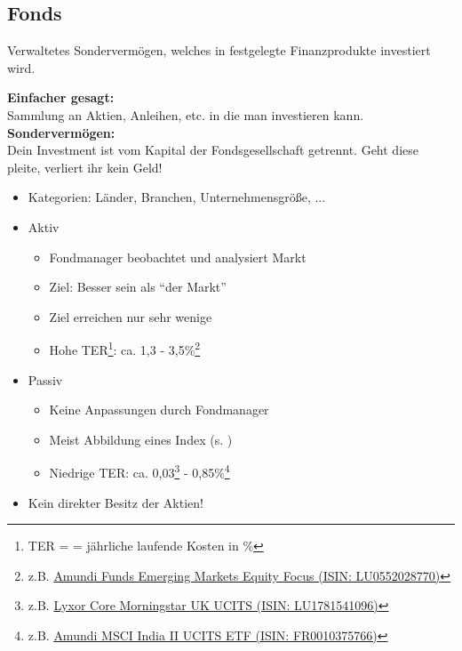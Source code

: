 \documentclass{beamer}
\begin{document}
		\subsection{Fonds}
		
			\begin{frame}
				\begin{definition}
					Verwaltetes Sondervermögen, welches in festgelegte Finanzprodukte investiert wird.
				\end{definition}
				\pause
				\textbf{Einfacher gesagt:}\\
				Sammlung an Aktien, Anleihen, etc. in die man investieren kann.\n
				\pause
				\textbf{Sondervermögen:}\\
				Dein Investment ist vom Kapital der Fondsgesellschaft getrennt.
				Geht diese pleite, verliert ihr kein Geld!
			\end{frame}
		
			\begin{frame}
				\begin{itemize}
					\item Kategorien: Länder, Branchen, Unternehmensgröße, ...\pause
					\item Aktiv
					\begin{itemize}
						\item Fondmanager beobachtet und analysiert Markt
						\item Ziel: Besser sein als "`der Markt"'
						\item Ziel erreichen nur sehr wenige
						\item Hohe TER\footnote{TER =  = jährliche laufende Kosten in \%}: ca. 1,3 - 3,5\%\footnote{z.B. \href{https://www.comdirect.de/inf/fonds/LU0552028770}{Amundi Funds Emerging Markets Equity Focus (ISIN: LU0552028770)}}
					\end{itemize}\pause
					\item Passiv\pause
					\begin{itemize}
						\item Keine Anpassungen durch Fondmanager
						\item Meist Abbildung eines Index (s. \nameref{subsec:etfs})
						\item Niedrige TER: ca. 0,03\footnote{z.B. \href{https://de.extraetf.com/etf-profile/LU1781541096}{Lyxor Core Morningstar UK UCITS (ISIN: LU1781541096)}} - 0,85\%\footnote{z.B. \href{https://extraetf.com/de/etf-profile/FR0010375766}{Amundi MSCI India II UCITS ETF (ISIN: FR0010375766)}}
					\end{itemize}\pause
					\item Kein direkter Besitz der Aktien!
				\end{itemize}
			\end{frame}
		
\end{document}
